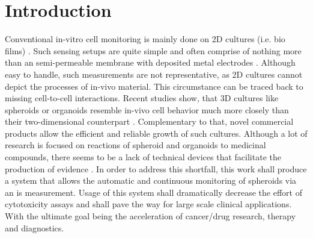 \chapter{Introduction}
Conventional in-vitro cell monitoring is mainly done on 2D cultures (i.e. bio films) \cite{Cho2020,Ranga2014}. Such sensing setups are quite simple and often comprise of nothing more than an semi-permeable membrane with deposited metal electrodes \cite{Hickman2016}. Although easy to handle, such measurements are not representative, as 2D cultures cannot depict the processes of in-vivo material. This circumstance can be traced back to missing cell-to-cell interactions. Recent studies show, that 3D cultures like spheroids or organoids resemble in-vivo cell behavior much more closely than their two-dimensional counterpart \cite{Ranga2014, Elliott2011}. Complementary to that, novel commercial products\cite{insphero, matrigel} allow the efficient and reliable growth of such cultures. Although a lot of research is focused on reactions of spheroid and organoids to medicinal compounds, there seems to be a lack of technical devices that facilitate the production of evidence \cite{Curto2018}. 
In order to address this shortfall, this work shall produce a system that allows the automatic and continuous monitoring of spheroids via an \gls{is} measurement. Usage of this system shall dramatically decrease the effort of cytotoxicity assays and shall pave the way for large scale clinical applications. With the ultimate goal being the acceleration of cancer/drug research, therapy and diagnostics. 